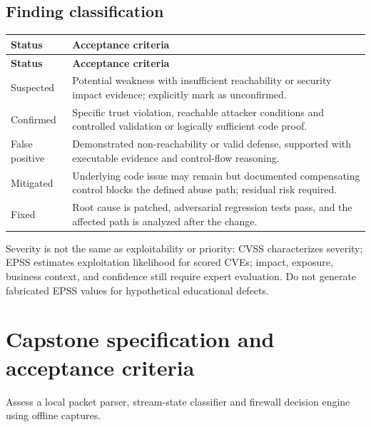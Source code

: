 \documentclass[10pt,letterpaper]{article}
\begin{document}
\subsection{Finding classification}
\begingroup\footnotesize\setlength\tabcolsep{3pt}
\begin{longtable}{>{\raggedright\arraybackslash}p{}>{\raggedright\arraybackslash}p{}}\toprule
\textbf{Status} & \textbf{Acceptance criteria}\\\midrule\endfirsthead
\toprule \textbf{Status} & \textbf{Acceptance criteria}\\\midrule\endhead
Suspected & Potential weakness with insufficient reachability or security impact evidence; explicitly mark as unconfirmed.\\\midrule
Confirmed & Specific trust violation, reachable attacker conditions and controlled validation or logically sufficient code proof.\\\midrule
False positive & Demonstrated non-reachability or valid defense, supported with executable evidence and control-flow reasoning.\\\midrule
Mitigated & Underlying code issue may remain but documented compensating control blocks the defined abuse path; residual risk required.\\\midrule
Fixed & Root cause is patched, adversarial regression tests pass, and the affected path is analyzed after the change.\\\midrule
\bottomrule\end{longtable}\endgroup
Severity is not the same as exploitability or priority: CVSS characterizes severity; EPSS estimates exploitation likelihood for scored CVEs; impact, exposure, business context, and confidence still require expert evaluation. Do not generate fabricated EPSS values for hypothetical educational defects.

\section{Capstone specification and acceptance criteria}
Assess a local packet parser, stream-state classifier and firewall decision engine using offline captures.
\end{document}

